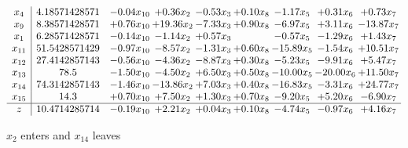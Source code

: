 \documentclass[9pt]{article}
\begin{document}
 \[\begin{array}{c| c c@{\hskip 2pt} c@{\hskip 2pt} c@{\hskip 2pt} c@{\hskip 2pt} c@{\hskip 2pt} c@{\hskip 2pt} c@{\hskip 2pt} }
 x_{4}   &  4.18571428571 & -0.04 x_{10} & +  0.36 x_{2} & -0.53 x_{3} & +  0.10 x_{8} & -1.17 x_{5} & +  0.31 x_{6} & +  0.73 x_{7}\\
 x_{9}   &  8.38571428571 & +  0.76 x_{10} & + 19.36 x_{2} & -7.33 x_{3} & +  0.90 x_{8} & -6.97 x_{5} & +  3.11 x_{6} & -13.87 x_{7}\\
 x_{1}   &  6.28571428571 & -0.14 x_{10} & -1.14 x_{2} & +  0.57 x_{3} &   & -0.57 x_{5} & -1.29 x_{6} & +  1.43 x_{7}\\
 x_{11}   &  51.5428571429 & -0.97 x_{10} & -8.57 x_{2} & -1.31 x_{3} & +  0.60 x_{8} & -15.89 x_{5} & -1.54 x_{6} & + 10.51 x_{7}\\
 x_{12}   &  27.4142857143 & -0.56 x_{10} & -4.36 x_{2} & -8.87 x_{3} & +  0.30 x_{8} & -5.23 x_{5} & -9.91 x_{6} & +  5.47 x_{7}\\
 x_{13}   &  78.5 & -1.50 x_{10} & -4.50 x_{2} & +  6.50 x_{3} & +  0.50 x_{8} & -10.00 x_{5} & -20.00 x_{6} & + 11.50 x_{7}\\
 x_{14}   &  74.3142857143 & -1.46 x_{10} & -13.86 x_{2} & +  7.03 x_{3} & +  0.40 x_{8} & -16.83 x_{5} & -3.31 x_{6} & + 24.77 x_{7}\\
 x_{15}   &  14.3 & +  0.70 x_{10} & +  7.50 x_{2} & +  1.30 x_{3} & +  0.70 x_{8} & -9.20 x_{5} & +  5.20 x_{6} & -6.90 x_{7}\\
\hline
z    &  10.4714285714 & -0.19 x_{10} & +  2.21 x_{2} & +  0.04 x_{3} & +  0.10 x_{8} & -4.74 x_{5} & -0.97 x_{6} & +  4.16 x_{7}\\
\end{array}\]


 $ x_{2} $ enters and $ x_{14} $ leaves 
\end{document}
